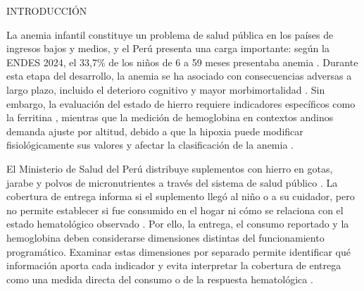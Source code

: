 \documentclass[man,11pt,donotrepeattitle,floatsintext]{apa7}
\makeatletter
\renewcommand{\section}{\@startsection {section}{1}{\z@}%
    {\b@level@one@skip}{\e@level@one@skip}%
    {\normalfont\large\bfseries\raggedright}}
\makeatother
\begin{document}
\vspace{1.0em}
\begin{center}
\end{center}
\vspace{0.8em}

\section{INTRODUCCIÓN}

La anemia infantil constituye un problema de salud pública en los países de ingresos bajos y medios, y el Perú presenta una carga importante: según la ENDES 2024, el 33{,}7\% de los niños de 6 a 59 meses presentaba anemia \parencite{chaparro2019,stevens2022,inei2025endes}. Durante esta etapa del desarrollo, la anemia se ha asociado con consecuencias adversas a largo plazo, incluido el deterioro cognitivo y mayor morbimortalidad \parencite{zavaleta2017}. Sin embargo, la evaluación del estado de hierro requiere indicadores específicos como la ferritina \parencite{who2011ferritin}, mientras que la medición de hemoglobina en contextos andinos demanda ajuste por altitud, debido a que la hipoxia puede modificar fisiológicamente sus valores y afectar la clasificación de la anemia \parencite{gonzales2019}.

El Ministerio de Salud del Perú distribuye suplementos con hierro en gotas, jarabe y polvos de micronutrientes a través del sistema de salud público \parencite{who2016iron,minsa2022}. La cobertura de entrega informa si el suplemento llegó al niño o a su cuidador, pero no permite establecer si fue consumido en el hogar ni cómo se relaciona con el estado hematológico observado \parencite{pasricha2013,munares2018}. Por ello, la entrega, el consumo reportado y la hemoglobina deben considerarse dimensiones distintas del funcionamiento programático. Examinar estas dimensiones por separado permite identificar qué información aporta cada indicador y evita interpretar la cobertura de entrega como una medida directa del consumo o de la respuesta hematológica \parencite{low2013}.
\end{document}
